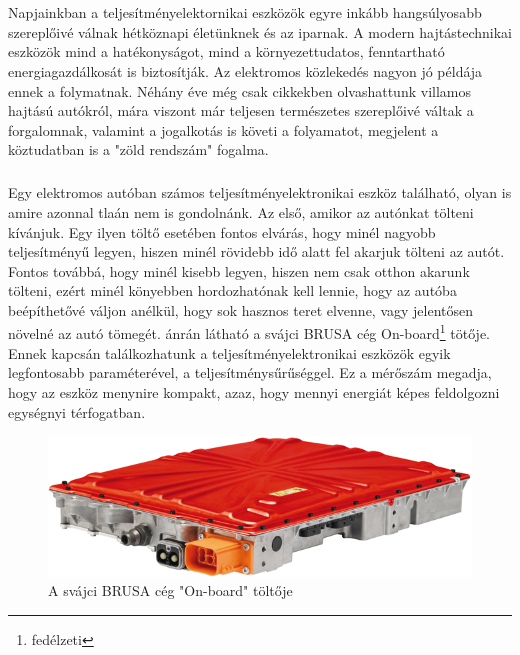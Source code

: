 \chapter*{\bevezeto}

\paragraph{}
Napjainkban a teljesítményelektornikai eszközök egyre inkább hangsúlyosabb szereplőivé válnak hétköznapi életünknek és az iparnak. A modern hajtástechnikai eszközök mind a hatékonyságot, mind a környezettudatos, fenntartható energiagazdálkosát is biztosítják. Az elektromos közlekedés nagyon jó példája ennek a folymatnak. Néhány éve még csak cikkekben olvashattunk villamos hajtású autókról, mára viszont már teljesen természetes szereplőivé váltak a forgalomnak, valamint a jogalkotás is követi a folyamatot, megjelent a köztudatban is a "zöld rendszám" fogalma. 

\paragraph{}
Egy elektromos autóban számos teljesítményelektronikai eszköz található, olyan is amire azonnal tlaán nem is gondolnánk. Az első, amikor az autónkat tölteni kívánjuk. Egy ilyen töltő esetében fontos elvárás, hogy minél nagyobb teljesítményű legyen, hiszen minél rövidebb idő alatt fel akarjuk tölteni az autót. Fontos továbbá, hogy minél kisebb legyen, hiszen nem csak otthon akarunk tölteni, ezért minél könyebben hordozhatónak kell lennie, hogy az autóba beépíthetővé váljon anélkül, hogy sok hasznos teret elvenne, vagy jelentősen növelné az autó tömegét.  ánrán látható a svájci BRUSA cég On-board\footnote{fedélzeti} tötője. Ennek kapcsán találkozhatunk a  teljesítményelektronikai eszközök egyik legfontosabb paraméterével, a teljesítménysűrűséggel. Ez a mérőszám megadja, hogy az eszköz menynire kompakt, azaz, hogy mennyi energiát képes feldolgozni egységnyi térfogatban.

\begin{figure}[!ht]
	\centering
	\includegraphics[width = \textwidth]{figures/brusa_charger.jpg}
	\caption{A svájci BRUSA cég "On-board" töltője} 
	\label{fig:brusa}
\end{figure}

